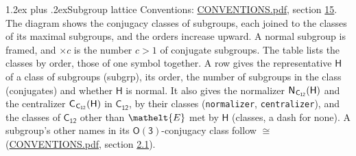 \documentclass[10pt,a4paper]{article}
\makeatletter
\renewcommand\section{\@startsection{section}{1}{\z@}{-3ex plus -1ex minus -.2ex}%
  {1.2ex plus .2ex}{\normalfont\large\sffamily\bfseries\color{parttitle}}}
\numberwithin{equation}{section}
\newcommand{\eltfont}[1]{{\let\sigma\eltsigma\mathelt{#1}}}
\newcommand{\grp}[1]{\mathsf{#1}}
\newcommand{\cls}[1]{\eltfont{#1}}
\newcommand{\samecls}{\cong}
\newcommand{\hairsp}{\mkern1mu}
\makeatother
\begin{document}
\section{Subgroup lattice}\label{s:subgroups}
Conventions: \href{../../CONVENTIONS.pdf}{CONVENTIONS.pdf}, section \href{../../CONVENTIONS.pdf\#conv.15}{15}.
The diagram shows the conjugacy classes of subgroups, each joined to the classes of its maximal subgroups, and the orders increase upward. \label{n:index.conjugates.c}A normal subgroup is framed, and ${\times}c$ is the number $c > 1$ of conjugate subgroups. The table lists the classes by order, those of one symbol together. \label{n:group.H}\label{n:head.subgroup}\label{n:head.order}\label{n:head.conjugates}\label{n:head.normal}A row gives the representative $\grp{H}$ of a class of subgroups (subgrp), its order, the number of subgroups in the class (conjugates) and whether $\grp{H}$ is normal. \label{n:group.normalizer}\label{n:group.centralizer}\label{n:head.classes}It also gives the normalizer $\grp{N}_{\hairsp \grp{C_{12}}}(\grp{H})$ and the centralizer $\grp{C}_{\hairsp \grp{C_{12}}}(\grp{H})$ in $\grp{C_{12}}$, by their classes (\texttt{normalizer}, \texttt{centralizer}), and the classes of $\grp{C_{12}}$ other than $\cls{E}$ met by $\grp{H}$ (classes, a dash for none). A subgroup's other names in its \href{O3.pdf}{$\grp{O(3)}$}-conjugacy class follow $\samecls$ (\href{../../CONVENTIONS.pdf}{CONVENTIONS.pdf}, section \href{../../CONVENTIONS.pdf\#conv.2.1}{2.1}).
\begin{center}
\end{center}
\end{document}
